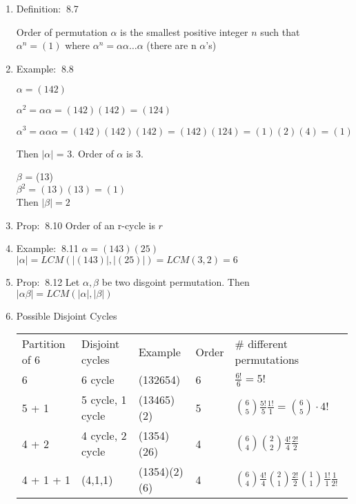\documentclass[12pt]{article}
\newcommand{\defi}{{\color{blue} Definition: $\ $}}
\newcommand{\exe}{{\color{green} Example: $\ $}}
\newcommand{\prop}{{\color{blue} Prop: $\ $}}
\begin{document}
\begin{enumerate}
\begin{enumerate}
        \item \defi 8.7 
        
        Order of permutation $\alpha$ is the smallest positive integer $n$ such that $\alpha^n = (1)$ where $\alpha^n = \alpha \alpha \dots \alpha$ (there are n $\alpha$'s)

        \item \exe 8.8 

        $\alpha = (142)$

        $\alpha^2 = \alpha \alpha = (142)(142) = (124)$

        $\alpha^3 = \alpha\alpha\alpha = (142)(142)(142) = (142)(124) = (1)(2)(4) = (1)$

        Then $|\alpha|$ = 3. Order of $\alpha$ is 3.

        $\beta$ = (13)\\
        $\beta^2 = (13)(13) = (1)$ \\
        Then $|\beta| = 2$
        
        \item \prop 8.10 Order of an r-cycle is $r$
        
        \item \exe 8.11 $\alpha = (143)(25)$\\
        $|\alpha| = LCM(|(143)|,|(25)|) = LCM(3,2) = 6 $

        \item \prop 8.12 Let $\alpha, \beta$ be two disgoint permutation. Then $|\alpha\beta| = LCM(|\alpha|,|\beta|)$
        
        \item Possible Disjoint Cycles
        
        \begin{tabular}{l|l|l|l|l}
            \hline
            Partition of 6 & Disjoint cycles & Example & Order & \# different permutations \\
            6 & 6 cycle & (132654)& 6 & $\frac{6!}{6} = 5!$ \\
            5 + 1& 5 cycle, 1 cycle & (13465)(2) & 5 & ${6 \choose 5} \frac{5!}{5} \frac{1!}{1} = {6 \choose 5}\cdot 4!$ \\
            4 + 2 & 4 cycle, 2 cycle & (1354)(26) & 4 & ${6 \choose 4}{2 \choose 2} \frac{4!}{4} \frac{2!}{2}$\\
            4 + 1 + 1 & (4,1,1) & (1354)(2)(6) & 4 & ${6 \choose 4}\frac{4!}{4}{2 \choose 1}\frac{2!}{2}{1 \choose 1}\frac{1!}{1} \frac{1}{2!}$
        \end{tabular}


\end{enumerate}
\end{enumerate}
\end{document}
